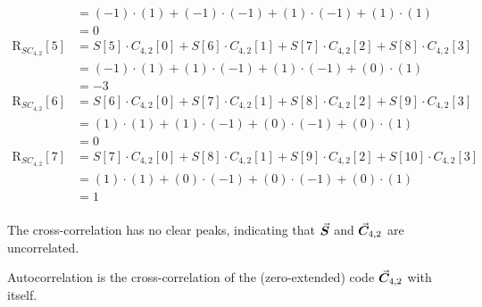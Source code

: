 \begin{solution}
\begin{tasks}
{\begin{equation*}
\begin{split}
			&= (-1) \cdot (1) + (-1) \cdot (-1) + (1) \cdot (-1) + (1) \cdot (1) \\
			&= 0 \\
			\mathrm{R}_{SC_{4,2}}[5] &= S[5] \cdot C_{4,2}[0] + S[6] \cdot C_{4,2}[1] + S[7] \cdot C_{4,2}[2] + S[8] \cdot C_{4,2}[3] \\
			&= (-1) \cdot (1) + (1) \cdot (-1) + (1) \cdot (-1) + (0) \cdot (1) \\
			&= -3 \\
			\mathrm{R}_{SC_{4,2}}[6] &= S[6] \cdot C_{4,2}[0] + S[7] \cdot C_{4,2}[1] + S[8] \cdot C_{4,2}[2] + S[9] \cdot C_{4,2}[3] \\
			&= (1) \cdot (1) + (1) \cdot (-1) + (0) \cdot (-1) + (0) \cdot (1) \\
			&= 0 \\
			\mathrm{R}_{SC_{4,2}}[7] &= S[7] \cdot C_{4,2}[0] + S[8] \cdot C_{4,2}[1] + S[9] \cdot C_{4,2}[2] + S[10] \cdot C_{4,2}[3] \\
			&= (1) \cdot (1) + (0) \cdot (-1) + (0) \cdot (-1) + (0) \cdot (1) \\
			&= 1 \\
			\end{split}
			\end{equation*}
			
			The cross-correlation has no clear peaks, indicating that $\vec{\bm{S}}$ and $\vec{\bm{C}}_{4,2}$ are uncorrelated.
		}
	
		\task
		{
			\tiny
			Autocorrelation is the cross-correlation of the (zero-extended) code $\vec{\bm{C}}_{4,2}$ with itself.
			
}
\end{tasks}
\end{solution}
